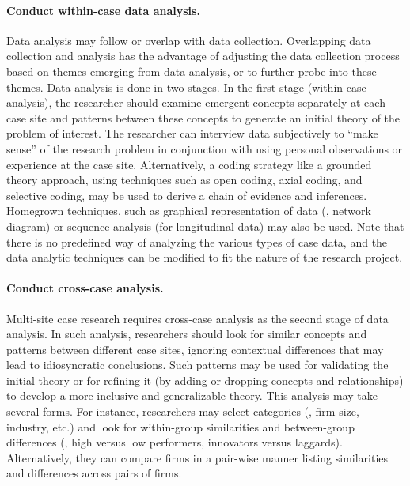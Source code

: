 \paragraph{Conduct within-case data analysis.} Data analysis may follow or overlap with data collection. Overlapping data collection and analysis has the advantage of adjusting the data collection process based on themes emerging from data analysis, or to further probe into these themes. Data analysis is done in two stages. In the first stage (within-case analysis), the researcher should examine emergent concepts separately at each case site and patterns between these concepts to generate an initial theory of the problem of interest. The researcher can interview data subjectively to ``make sense'' of the research problem in conjunction with using personal observations or experience at the case site. Alternatively, a coding strategy like a grounded theory approach, using techniques such as open coding, axial coding, and selective coding, may be used to derive a chain of evidence and inferences. Homegrown techniques, such as graphical representation of data (\eg, network diagram) or sequence analysis (for longitudinal data) may also be used. Note that there is no predefined way of analyzing the various types of case data, and the data analytic techniques can be modified to fit the nature of the research project.

\paragraph{Conduct cross-case analysis.} Multi-site case research requires cross-case analysis as the second stage of data analysis. In such analysis, researchers should look for similar concepts and patterns between different case sites, ignoring contextual differences that may lead to idiosyncratic conclusions. Such patterns may be used for validating the initial theory or for refining it (by adding or dropping concepts and relationships) to develop a more inclusive and generalizable theory. This analysis may take several forms. For instance, researchers may select categories (\eg, firm size, industry, etc.) and look for within-group similarities and between-group differences (\eg, high versus low performers, innovators versus laggards). Alternatively, they can compare firms in a pair-wise manner listing similarities and differences across pairs of firms.

